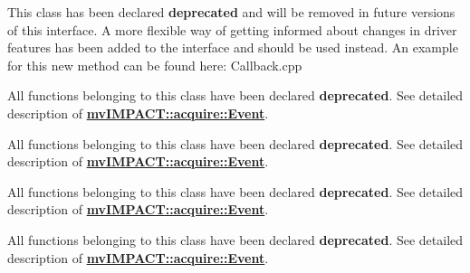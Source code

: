 \begin{DoxyRefList}
\item[\label{deprecated__deprecated000011}%
\hypertarget{deprecated__deprecated000011}{}%
类 \hyperlink{classmv_i_m_p_a_c_t_1_1acquire_1_1_event}{mv\+I\+M\+P\+A\+C\+T\+:\+:acquire\+:\+:Event} ]This class has been declared {\bfseries deprecated} and will be removed in future versions of this interface. A more flexible way of getting informed about changes in driver features has been added to the interface and should be used instead. An example for this new method can be found here\+: Callback.\+cpp 
\item[\label{deprecated__deprecated000021}%
\hypertarget{deprecated__deprecated000021}{}%
成员 \hyperlink{classmv_i_m_p_a_c_t_1_1acquire_1_1_event_af129965537dfc66b9661538619872fd0}{mv\+I\+M\+P\+A\+C\+T\+:\+:acquire\+:\+:Event\+:\+:mode} ]All functions belonging to this class have been declared {\bfseries deprecated}. See detailed description of {\bfseries \hyperlink{classmv_i_m_p_a_c_t_1_1acquire_1_1_event}{mv\+I\+M\+P\+A\+C\+T\+::acquire\+::\+Event}}. 
\item[\label{deprecated__deprecated000020}%
\hypertarget{deprecated__deprecated000020}{}%
成员 \hyperlink{classmv_i_m_p_a_c_t_1_1acquire_1_1_event_ad0fc0c13e687365fddcf972d9b2f9daa}{mv\+I\+M\+P\+A\+C\+T\+:\+:acquire\+:\+:Event\+:\+:M\+V\+I\+M\+P\+A\+C\+T\+\_\+\+D\+E\+P\+R\+E\+C\+A\+T\+E\+D\+\_\+\+C\+P\+P} (const \hyperlink{struct_event_data}{Event\+Data} \&get\+Data(void) const )]All functions belonging to this class have been declared {\bfseries deprecated}. See detailed description of {\bfseries \hyperlink{classmv_i_m_p_a_c_t_1_1acquire_1_1_event}{mv\+I\+M\+P\+A\+C\+T\+::acquire\+::\+Event}}. 
\item[\label{deprecated__deprecated000022}%
\hypertarget{deprecated__deprecated000022}{}%
成员 \hyperlink{classmv_i_m_p_a_c_t_1_1acquire_1_1_event_a1317c421236a92fc1aab555c53a40906}{mv\+I\+M\+P\+A\+C\+T\+:\+:acquire\+:\+:Event\+:\+:queue\+Depth} ]All functions belonging to this class have been declared {\bfseries deprecated}. See detailed description of {\bfseries \hyperlink{classmv_i_m_p_a_c_t_1_1acquire_1_1_event}{mv\+I\+M\+P\+A\+C\+T\+::acquire\+::\+Event}}. 
\item[\label{deprecated__deprecated000023}%
\hypertarget{deprecated__deprecated000023}{}%
成员 \hyperlink{classmv_i_m_p_a_c_t_1_1acquire_1_1_event_a0747b4aa5d3d5f0adcfedbc635aa5def}{mv\+I\+M\+P\+A\+C\+T\+:\+:acquire\+:\+:Event\+:\+:type} ]All functions belonging to this class have been declared {\bfseries deprecated}. See detailed description of {\bfseries \hyperlink{classmv_i_m_p_a_c_t_1_1acquire_1_1_event}{mv\+I\+M\+P\+A\+C\+T\+::acquire\+::\+Event}}. 

\end{DoxyRefList}
